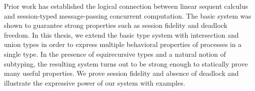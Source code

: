 Prior work has established the logical connection between linear sequent calculus and session-typed message-passing concurrent computation. The basic system was shown to guarantee strong properties such as session fidelity and deadlock freedom. In this thesis, we extend the basic type system with intersection and union types in order to express multiple behavioral properties of processes in a single type. In the presence of equirecursive types and a natural notion of subtyping, the resulting system turns out to be strong enough to statically prove many useful properties. We prove session fidelity and absence of deadlock and illustrate the expressive power of our system with examples.
